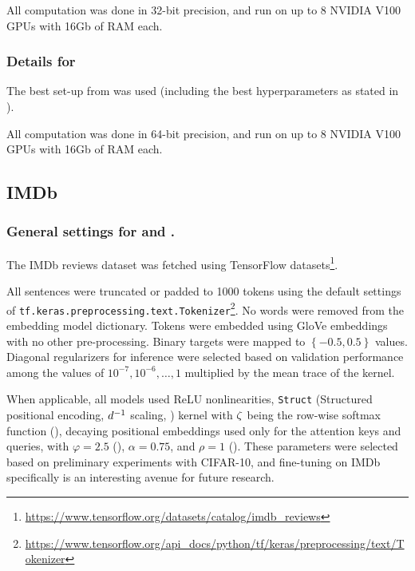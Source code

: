 All computation was done in 32-bit precision, and run on up to 8 NVIDIA V100 GPUs with 16Gb of RAM each.


\subsubsection{Details for }\label{sect:full_cifar_appendix}

The best set-up from  was used (including the best hyperparameters as stated in ).

All computation was done in 64-bit precision, and run on up to 8 NVIDIA V100 GPUs with 16Gb of RAM each.


\subsection{IMDb}

\subsubsection{General settings for  and .}

    The IMDb reviews dataset \citep{maas2011learning} was fetched using TensorFlow datasets\footnote{\url{https://www.tensorflow.org/datasets/catalog/imdb\_reviews}}.

    All sentences were truncated or padded to 1000 tokens using the default settings of \texttt{tf.keras.preprocessing.text.Tokenizer}\footnote{\url{https://www.tensorflow.org/api_docs/python/tf/keras/preprocessing/text/Tokenizer}}. No words were removed from the embedding model dictionary. Tokens were embedded using GloVe embeddings \citep{pennington2014glove} with no other pre-processing. Binary targets were mapped to $\left\{-0.5, 0.5\right\}$ values. Diagonal regularizers for inference were selected based on validation performance among the values of $10^{-7},10^{-6},\dots,1$ multiplied by the mean trace of the kernel.
    
    When applicable, all models used ReLU nonlinearities, \texttt{Struct} (Structured positional encoding, $d^{-1}$ scaling, ) kernel with $\zeta$ being the row-wise softmax function (), decaying positional embeddings used only for the attention keys and queries, with $\varphi=2.5$ (), $\alpha = 0.75$, and $\rho = 1$ (). These parameters were selected based on preliminary experiments with CIFAR-10, and fine-tuning on IMDb specifically is an interesting avenue for future research.
    
